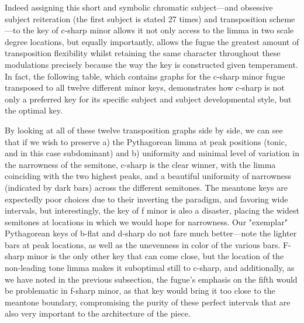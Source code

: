 Indeed assigning this short and symbolic chromatic subject---and
obsessive subject reiteration (the first subject is stated 27 times) and
transposition scheme---to the key of c-sharp minor allows it not
only access to the limma in two scale degree locations, but equally
importantly, allows the fugue the greatest amount of transposition
flexibility whilst retaining the same character throughout these
modulations precisely because the way the key is constructed given
temperament. In fact, the following table, which contains graphs for the
c-sharp minor fugue transposed to all twelve different minor keys,
demonstrates how c-sharp is not only a preferred key for its specific
subject and subject developmental style, but the optimal key.


    \begin{center}
    \end{center}
    
    By looking at all of these twelve transposition graphs side by side, we
can see that if we wish to preserve a) the Pythagorean limma at peak
positions (tonic, and in this case subdominant) and b) uniformity and
minimal level of variation in the narrowness of the semitone, c-sharp is
the clear winner, with the limma coinciding with the two highest peaks,
and a beautiful uniformity of narrowness (indicated by dark bars) across
the different semitones. The meantone keys are expectedly poor choices
due to their inverting the paradigm, and favoring wide intervals, but
interestingly, the key of f minor is also a disaster, placing the widest
semitones at locations in which we would hope for narrowness. Our
"exemplar" Pythagorean keys of b-flat and d-sharp do not fare much
better---note the lighter bars at peak locations, as well as the
unevenness in color of the various bars. F-sharp minor is the only other
key that can come close, but the location of the non-leading tone limma
makes it suboptimal still to c-sharp, and additionally, as we have noted
in the previous subsection, the fugue's emphasis on the fifth would be
problematic in f-sharp minor, as that key would bring it too close to
the meantone boundary, compromising the purity of these perfect
intervals that are also very important to the architecture of the piece.

